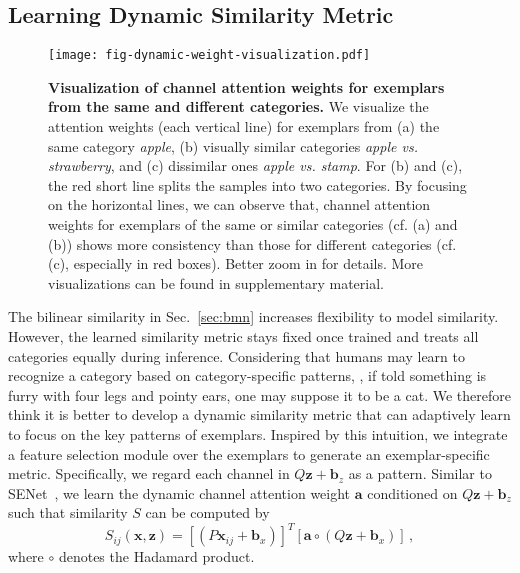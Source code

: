 \documentclass[10pt,twocolumn,letterpaper]{article}
\begin{document}
\subsection{Learning Dynamic Similarity Metric}
\label{sec:dynamic-similarity-metric}
\begin{figure}[!t]
  \centering 
   \texttt{[image: fig-dynamic-weight-visualization.pdf]}\vspace{-10pt}
   \caption{\textbf{Visualization of channel attention weights for exemplars from the same and different categories.}
   We visualize the attention weights (each vertical line) for exemplars from (a) the same category \textit{apple}, (b) visually similar categories \textit{apple vs. strawberry}, and (c) dissimilar ones \textit{apple vs. stamp}. For (b) and (c), the red short line splits the samples into two categories. By focusing on the horizontal lines, we can observe that, channel attention weights for exemplars of the same or similar categories (cf. (a) and (b)) shows more consistency than those for different categories (cf. (c), especially in red boxes). Better zoom in for details. More visualizations can be found in supplementary material.}
   \label{fig:dynamic-weight-visualization}
   \vspace{-5pt}
\end{figure}

The bilinear similarity in Sec.~\ref{sec:bmn} increases flexibility to model similarity. However, the learned similarity metric stays fixed once trained and treats all categories equally during inference. Considering that humans may learn to recognize a category based on category-specific patterns, \eg, if told something is furry with four legs and pointy ears, one may suppose it to be a cat. We therefore think it is better to develop a dynamic similarity metric that can adaptively learn to focus on the key patterns of exemplars. Inspired by this intuition, we integrate a feature selection module over the exemplars to generate an exemplar-specific metric. 
Specifically, we regard each channel in $Q\boldsymbol{z} + \boldsymbol{b}_z$ as a pattern. Similar to SENet~\cite{senet}, we learn the dynamic channel attention weight $\boldsymbol{a}$ conditioned on $Q\boldsymbol{z} + \boldsymbol{b}_z$ such that similarity $S$ can be computed by
\begin{equation}\label{equation:dynamic-similarity-measuring-metric}
    S_{ij}\left(\boldsymbol{x,z}\right) = \left[ (P\boldsymbol{x}_{ij} + \boldsymbol{b}_x) \right] ^T\left[\boldsymbol{a}\circ (Q\boldsymbol{z} + \boldsymbol{b}_x) \right]\,, 
\end{equation}
where $\circ$ denotes the Hadamard product. 
\end{document}

